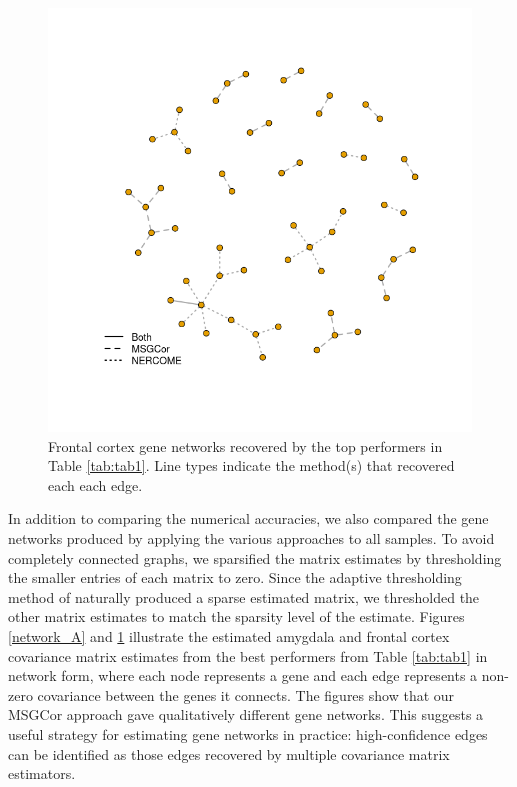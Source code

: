 \documentclass[useAMS,referee,usenatbib]{biom}
\begin{document}
\begin{figure}
  \begin{center}
    \includegraphics[width=0.45\textheight]{img/networks_FC_2.png}
  \end{center}
\caption{Frontal cortex gene networks recovered by the top performers in Table \ref{tab:tab1}. Line types indicate the method(s) that recovered each each edge.}
\label{network_FC}
\end{figure}

In addition to comparing the numerical accuracies, we also compared the gene networks produced by applying the various approaches to all samples. To avoid completely connected graphs, we sparsified the matrix estimates by thresholding the smaller entries of each matrix to zero. Since the adaptive thresholding method of \citet{cai2011adaptive} naturally produced a sparse estimated matrix, we thresholded the other matrix estimates to match the sparsity level of the \citet{cai2011adaptive} estimate. Figures \ref{network_A} and \ref{network_FC} illustrate the estimated amygdala and frontal cortex covariance matrix estimates from the best performers from Table \ref{tab:tab1} in network form, where each node represents a gene and each edge represents a non-zero covariance between the genes it connects. The figures show that our MSGCor approach gave qualitatively different gene networks. This suggests a useful strategy for estimating gene networks in practice: high-confidence edges can be identified as those edges recovered by multiple covariance matrix estimators.
\end{document}
